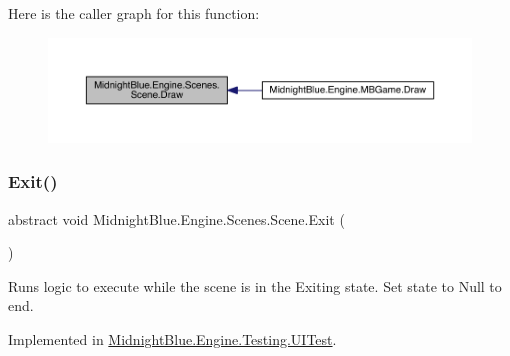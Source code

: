 Here is the caller graph for this function\+:
\nopagebreak
\begin{figure}[H]
\begin{center}
\leavevmode
\includegraphics[width=350pt]{class_midnight_blue_1_1_engine_1_1_scenes_1_1_scene_a6ec0b4be6c7dc226c9afd308e1fb3fd3_icgraph}
\end{center}
\end{figure}
\hypertarget{class_midnight_blue_1_1_engine_1_1_scenes_1_1_scene_adbf0f6d758df9fc5e20f24f327599e67}{}\label{class_midnight_blue_1_1_engine_1_1_scenes_1_1_scene_adbf0f6d758df9fc5e20f24f327599e67} 
\subsubsection{\texorpdfstring{Exit()}{Exit()}}
{\footnotesize\ttfamily abstract void Midnight\+Blue.\+Engine.\+Scenes.\+Scene.\+Exit (\begin{DoxyParamCaption}{ }\end{DoxyParamCaption})\hspace{0.3cm}{\ttfamily [pure virtual]}}



Runs logic to execute while the scene is in the Exiting state. Set state to Null to end. 



Implemented in \hyperlink{class_midnight_blue_1_1_engine_1_1_testing_1_1_u_i_test_a48b16a69a8d34b0d8d2fc30ead3c79ca}{Midnight\+Blue.\+Engine.\+Testing.\+U\+I\+Test}.

